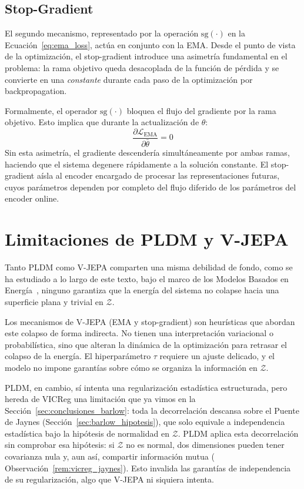 \subsection{Stop-Gradient}
\label{subsec:stop_gradient}

El segundo mecanismo, representado por la operación $\text{sg}(\cdot)$ en la Ecuación~\ref{eq:ema_loss}, actúa en conjunto con la EMA. Desde el punto de vista de la optimización, el stop-gradient introduce una asimetría fundamental en el problema: la rama objetivo queda desacoplada de la función de pérdida y se convierte en una \emph{constante} durante cada paso de la optimización por backpropagation.

Formalmente, el operador $\text{sg}(\cdot)$ bloquea el flujo del gradiente por la rama objetivo. Esto implica que durante la actualización de $\theta$:
\begin{equation}
\label{eq:stop_grad}
\frac{\partial \mathcal{L}_{\text{EMA}}}{\partial \bar{\theta}} = 0
\end{equation}
Sin esta asimetría, el gradiente descendería simultáneamente por ambas ramas, haciendo que el sistema degenere rápidamente a la solución constante. El stop-gradient aísla al encoder encargado de procesar las representaciones futuras, cuyos parámetros dependen por completo del flujo diferido de los parámetros del encoder online.

\section{Limitaciones de PLDM y V-JEPA}
\label{sec:limitaciones_vjepa_pldm}

Tanto PLDM como V-JEPA comparten una misma debilidad de fondo, como se ha estudiado a lo largo de este texto, bajo el marco de los Modelos Basados en Energía~\cite{lecun2006tutorial}, ninguno garantiza que la energía del sistema no colapse hacia una superficie plana y trivial en $\mathcal{Z}$.

Los mecanismos de V-JEPA (EMA y stop-gradient) son heurísticas que abordan este colapso de forma indirecta. No tienen una interpretación variacional o probabilística, sino que alteran la dinámica de la optimización para retrasar el colapso de la energía. El hiperparámetro $\tau$ requiere un ajuste delicado, y el modelo no impone garantías sobre cómo se organiza la información en $\mathcal{Z}$.

PLDM, en cambio, sí intenta una regularización estadística estructurada, pero hereda de VICReg una limitación que ya vimos en la Sección~\ref{sec:conclusiones_barlow}: toda la decorrelación descansa sobre el Puente de Jaynes (Sección~\ref{sec:barlow_hipotesis}), que solo equivale a independencia estadística bajo la hipótesis de normalidad en $\mathcal{Z}$. PLDM aplica esta decorrelación sin comprobar esa hipótesis: si $\mathcal{Z}$ no es normal, dos dimensiones pueden tener covarianza nula y, aun así, compartir información mutua ( Observación~\ref{rem:vicreg_jaynes}). Esto invalida las garantías de independencia de su regularización, algo que V-JEPA ni siquiera intenta.

